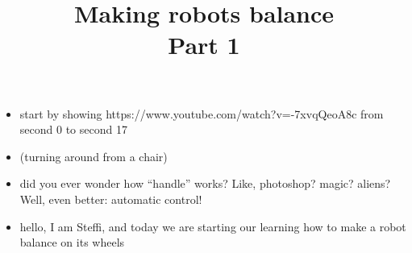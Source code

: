 \newif	\ifexternalize					%
\newif	\ifshowonlynotes				%
\newif	\ifhandout						%
\newif	\ifshowsolutions				%
\newif	\ifshownotes					%
\ifdefined\EXTERNALIZE	\externalizetrue	\fi						%
\ifdefined\ONLYNOTES	\showonlynotestrue	\fi						%
\ifdefined\HANDOUT		\handouttrue		\fi						%
\ifdefined\SOLUTIONS	\showsolutionstrue	\fi						%
\ifdefined\NOTES		\shownotestrue		\fi						%
\title		[Balancing Robots]	{Making robots balance \\ Part 1}	%
\date		{} %


\begin{frame}
	\begin{itemize}
		\item start by showing https://www.youtube.com/watch?v=-7xvqQeoA8c from second 0 to second 17
	\end{itemize}
\end{frame}


\begin{frame}
	\begin{itemize}
		\item (turning around from a chair)
		\item did you ever wonder how ``handle'' works? Like, photoshop? magic? aliens? Well, even better: automatic control!
		\item hello, I am Steffi, and today we are starting our learning how to make a robot balance on its wheels
	\end{itemize}
\end{frame}



